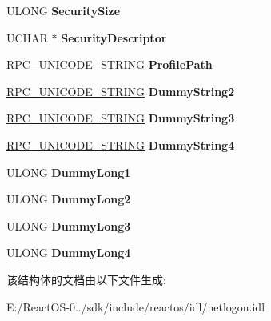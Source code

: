 \begin{DoxyCompactItemize}
U\+L\+O\+NG {\bfseries Security\+Size}
\item 
\mbox{\label{struct___n_e_t_l_o_g_o_n___d_e_l_t_a___u_s_e_r_a27a877aa82534aa8339cc3fd6b61ab15}} 
U\+C\+H\+AR $\ast$ {\bfseries Security\+Descriptor}
\item 
\mbox{\label{struct___n_e_t_l_o_g_o_n___d_e_l_t_a___u_s_e_r_a58bede96aa98f790bfe875ede009eca6}} 
\hyperlink{struct___r_p_c___u_n_i_c_o_d_e___s_t_r_i_n_g}{R\+P\+C\+\_\+\+U\+N\+I\+C\+O\+D\+E\+\_\+\+S\+T\+R\+I\+NG} {\bfseries Profile\+Path}
\item 
\mbox{\label{struct___n_e_t_l_o_g_o_n___d_e_l_t_a___u_s_e_r_ad95f7cb3442285fc6786e9f4054baf3f}} 
\hyperlink{struct___r_p_c___u_n_i_c_o_d_e___s_t_r_i_n_g}{R\+P\+C\+\_\+\+U\+N\+I\+C\+O\+D\+E\+\_\+\+S\+T\+R\+I\+NG} {\bfseries Dummy\+String2}
\item 
\mbox{\label{struct___n_e_t_l_o_g_o_n___d_e_l_t_a___u_s_e_r_a13b90fe7e1ea3a4ab35e567293c4c2e9}} 
\hyperlink{struct___r_p_c___u_n_i_c_o_d_e___s_t_r_i_n_g}{R\+P\+C\+\_\+\+U\+N\+I\+C\+O\+D\+E\+\_\+\+S\+T\+R\+I\+NG} {\bfseries Dummy\+String3}
\item 
\mbox{\label{struct___n_e_t_l_o_g_o_n___d_e_l_t_a___u_s_e_r_aba62f82bc5c63376ba961d42bd706835}} 
\hyperlink{struct___r_p_c___u_n_i_c_o_d_e___s_t_r_i_n_g}{R\+P\+C\+\_\+\+U\+N\+I\+C\+O\+D\+E\+\_\+\+S\+T\+R\+I\+NG} {\bfseries Dummy\+String4}
\item 
\mbox{\label{struct___n_e_t_l_o_g_o_n___d_e_l_t_a___u_s_e_r_afa0b219964a1749925d6b452a0d03ed0}} 
U\+L\+O\+NG {\bfseries Dummy\+Long1}
\item 
\mbox{\label{struct___n_e_t_l_o_g_o_n___d_e_l_t_a___u_s_e_r_a58ea0a3e8370cd44d95e1c03a1544e41}} 
U\+L\+O\+NG {\bfseries Dummy\+Long2}
\item 
\mbox{\label{struct___n_e_t_l_o_g_o_n___d_e_l_t_a___u_s_e_r_a7b8ff1252e1004fdce56d45d8c960488}} 
U\+L\+O\+NG {\bfseries Dummy\+Long3}
\item 
\mbox{\label{struct___n_e_t_l_o_g_o_n___d_e_l_t_a___u_s_e_r_a8271f47e767d3e0d95254b50901cad0f}} 
U\+L\+O\+NG {\bfseries Dummy\+Long4}
\end{DoxyCompactItemize}


该结构体的文档由以下文件生成\+:\begin{DoxyCompactItemize}
\item 
E\+:/\+React\+O\+S-\/0../sdk/include/reactos/idl/netlogon.\+idl\end{DoxyCompactItemize}
